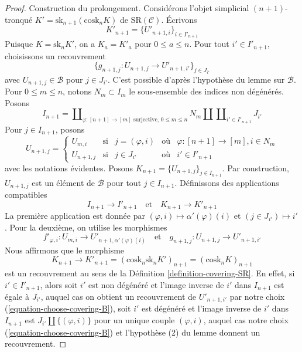 \begin{proof}
\medskip\noindent
Construction du prolongement. Considérons l'objet simplicial $(n + 1)$-tronqué
$K' = \text{sk}_{n + 1}(\text{cosk}_n K)$ de $\text{SR}(\mathcal{C})$.
Écrivons
$$
K'_{n + 1} = \{U'_{n + 1, i}\}_{i \in I'_{n + 1}}
$$
Puisque $K = \text{sk}_n K'$, on a $K_a = K'_a$ pour $0 \leq a \leq n$.
Pour tout $i' \in I'_{n + 1}$, choisissons un recouvrement
\begin{equation}
\label{equation-choose-covering-B}
\{g_{n + 1, j} : U_{n + 1, j} \to U'_{n + 1, i'}\}_{j \in J_{i'}}
\end{equation}
avec $U_{n + 1, j} \in \mathcal{B}$ pour $j \in J_{i'}$.
C'est possible d'après l'hypothèse du lemme sur $\mathcal{B}$.
Pour $0 \leq m \leq n$, notons $N_m \subset I_m$ le sous-ensemble des
indices non dégénérés. Posons
$$
I_{n + 1} =
\coprod\nolimits_{\varphi : [n + 1] \to [m]\text{ surjective, }0\leq m \leq n}
N_m \amalg
\coprod\nolimits_{i' \in I'_{n + 1}} J_{i'}
$$
Pour $j \in I_{n + 1}$, posons
$$
U_{n + 1, j} =
\left\{
\begin{matrix}
U_{m, i} & \text{si} &
j = (\varphi, i) & \text{où} & \varphi : [n + 1] \to [m], i \in N_m \\
U_{n + 1, j} & \text{si} &
j \in J_{i'} & \text{où} & i' \in I'_{n + 1}
\end{matrix}
\right.
$$
avec les notations évidentes. Posons $K_{n + 1} = \{U_{n + 1, j}\}_{j \in I_{n + 1}}$.
Par construction, $U_{n + 1, j}$ est un élément
de $\mathcal{B}$ pour tout $j \in I_{n + 1}$. Définissons des
applications compatibles
$$
I_{n + 1} \to I'_{n + 1}
\quad\text{et}\quad
K_{n + 1} \to K'_{n + 1}
$$
La première application est donnée par
$(\varphi, i) \mapsto \alpha'(\varphi)(i)$ et
$(j \in J_{i'}) \mapsto i'$.
Pour la deuxième, on utilise les morphismes
$$
f'_{\varphi, i} : U_{m, i} \to U'_{n + 1, \alpha'(\varphi)(i)}
\quad\text{et}\quad
g_{n + 1, j} : U_{n + 1, j} \to U'_{n + 1, i'}
$$
Nous affirmons que le morphisme
$$
K_{n + 1} \to K'_{n + 1} =
(\text{cosk}_n \text{sk}_n K')_{n + 1} =
(\text{cosk}_n K)_{n + 1}
$$
est un recouvrement au sens de la Définition \ref{definition-covering-SR}.
En effet, si $i' \in I'_{n + 1}$, alors soit $i'$ est non dégénéré
et l'image inverse de $i'$ dans $I_{n + 1}$ est égale à $J_{i'}$,
auquel cas on obtient un recouvrement de $U'_{n + 1, i'}$ par notre choix
(\ref{equation-choose-covering-B}), soit $i'$ est dégénéré et
l'image inverse de $i'$ dans $I_{n + 1}$ est
$J_{i'} \amalg \{(\varphi, i)\}$ pour un unique couple $(\varphi, i)$,
auquel cas notre choix (\ref{equation-choose-covering-B})
et l'hypothèse (2) du lemme donnent un recouvrement.


\end{proof}
